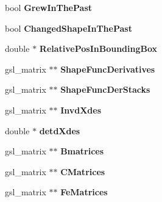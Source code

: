 \begin{DoxyCompactItemize}
\item 
\hypertarget{classShapeBase_ad7e1adfd2058cd5162816f9087a77c94}{}bool {\bfseries Grew\+In\+The\+Past}\label{classShapeBase_ad7e1adfd2058cd5162816f9087a77c94}

\item 
\hypertarget{classShapeBase_ac733487c1f89ed95f2fc2af960d933df}{}bool {\bfseries Changed\+Shape\+In\+The\+Past}\label{classShapeBase_ac733487c1f89ed95f2fc2af960d933df}

\item 
\hypertarget{classShapeBase_a57b594e048211647ba670710be0509f2}{}double $\ast$ {\bfseries Relative\+Pos\+In\+Bounding\+Box}\label{classShapeBase_a57b594e048211647ba670710be0509f2}

\item 
\hypertarget{classShapeBase_a80a8943320a0cdc871565acded52b239}{}gsl\+\_\+matrix $\ast$$\ast$ {\bfseries Shape\+Func\+Derivatives}\label{classShapeBase_a80a8943320a0cdc871565acded52b239}

\item 
\hypertarget{classShapeBase_a23deaddf67b09f6fe5470f05385001fe}{}gsl\+\_\+matrix $\ast$$\ast$ {\bfseries Shape\+Func\+Der\+Stacks}\label{classShapeBase_a23deaddf67b09f6fe5470f05385001fe}

\item 
\hypertarget{classShapeBase_a4a5fc631abba61fa2488112a7a674377}{}gsl\+\_\+matrix $\ast$$\ast$ {\bfseries Invd\+Xdes}\label{classShapeBase_a4a5fc631abba61fa2488112a7a674377}

\item 
\hypertarget{classShapeBase_ad1c2ef88314c7e567ca2bdcc6592f5ec}{}double $\ast$ {\bfseries detd\+Xdes}\label{classShapeBase_ad1c2ef88314c7e567ca2bdcc6592f5ec}

\item 
\hypertarget{classShapeBase_ace860a66508f503be2a46c351a9358c3}{}gsl\+\_\+matrix $\ast$$\ast$ {\bfseries Bmatrices}\label{classShapeBase_ace860a66508f503be2a46c351a9358c3}

\item 
\hypertarget{classShapeBase_adbb0a1617e6e0acfbf67038a5aed8366}{}gsl\+\_\+matrix $\ast$$\ast$ {\bfseries C\+Matrices}\label{classShapeBase_adbb0a1617e6e0acfbf67038a5aed8366}

\item 
\hypertarget{classShapeBase_ac3259f3f52ab4d7a514ea987012a6bd6}{}gsl\+\_\+matrix $\ast$$\ast$ {\bfseries Fe\+Matrices}\label{classShapeBase_ac3259f3f52ab4d7a514ea987012a6bd6}


\end{DoxyCompactItemize}
